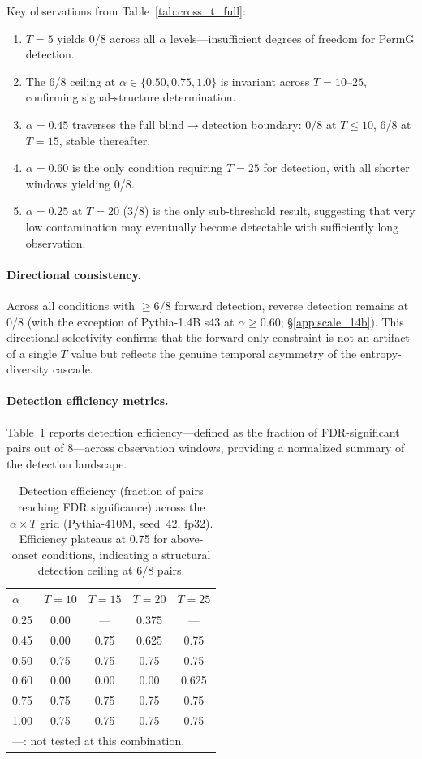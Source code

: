 Key observations from Table~\ref{tab:cross_t_full}:
\begin{enumerate}
\item $T{=}5$ yields 0/8 across all $\alpha$ levels---insufficient degrees of freedom for PermG detection.
\item The 6/8 ceiling at $\alpha \in \{0.50, 0.75, 1.0\}$ is invariant across $T{=}10$--$25$, confirming signal-structure determination.
\item $\alpha{=}0.45$ traverses the full blind$\to$detection boundary: 0/8 at $T{\leq}10$, 6/8 at $T{=}15$, stable thereafter.
\item $\alpha{=}0.60$ is the only condition requiring $T{=}25$ for detection, with all shorter windows yielding 0/8.
\item $\alpha{=}0.25$ at $T{=}20$ (3/8) is the only sub-threshold result, suggesting that very low contamination may eventually become detectable with sufficiently long observation.
\end{enumerate}

\paragraph{Directional consistency.}
Across all conditions with ${\geq}6/8$ forward detection, reverse detection remains at 0/8 (with the exception of Pythia-1.4B s43 at $\alpha{\geq}0.60$; \S\ref{app:scale_14b}).
This directional selectivity confirms that the forward-only constraint is not an artifact of a single $T$ value but reflects the genuine temporal asymmetry of the entropy-diversity cascade.

\paragraph{Detection efficiency metrics.}
Table~\ref{tab:detection_efficiency} reports detection efficiency---defined as the fraction of FDR-significant pairs out of 8---across observation windows, providing a normalized summary of the detection landscape.

\begin{table}[t]
\centering
\small
\caption{Detection efficiency (fraction of pairs reaching FDR significance) across the $\alpha \times T$ grid (Pythia-410M, seed~42, fp32). Efficiency plateaus at 0.75 for above-onset conditions, indicating a structural detection ceiling at 6/8 pairs.}
\label{tab:detection_efficiency}
\begin{tabular}{lcccc}
\toprule
$\alpha$ & $T{=}10$ & $T{=}15$ & $T{=}20$ & $T{=}25$ \\
\midrule
0.25 & 0.00 & --- & 0.375 & --- \\
0.45 & 0.00 & 0.75 & 0.625 & 0.75 \\
0.50 & 0.75 & 0.75 & 0.75 & 0.75 \\
0.60 & 0.00 & 0.00 & 0.00 & 0.625 \\
0.75 & 0.75 & 0.75 & 0.75 & 0.75 \\
1.00 & 0.75 & 0.75 & 0.75 & 0.75 \\
\bottomrule
\multicolumn{5}{l}{\footnotesize ---: not tested at this combination.}
\end{tabular}
\end{table}

